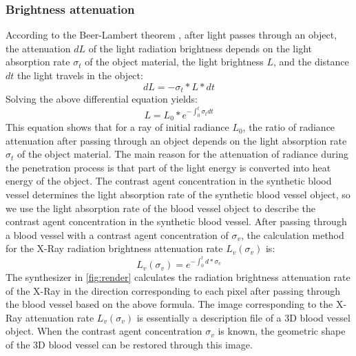 \subsubsection{Brightness attenuation}
According to the Beer-Lambert theorem \cite{Beer-Lambert}, after light passes through an object, the attenuation $dL$ of the light radiation brightness depends on the light absorption rate $\sigma_t$ of the object material, the light brightness $L$, and the distance $dt$ the light travels in the object:
\begin{equation}
dL = -\sigma_t * L * dt
\end{equation}
Solving the above differential equation yields:
\begin{equation}
L = L_0 * e^{-\int_0^t \sigma_t dt}
\end{equation}
This equation shows that for a ray of initial radiance $L_0$, the ratio of radiance attenuation after passing through an object depends on the light absorption rate $\sigma_t$ of the object material. The main reason for the attenuation of radiance during the penetration process is that part of the light energy is converted into heat energy of the object. The contrast agent concentration in the synthetic blood vessel determines the light absorption rate of the synthetic blood vessel object, so we use the light absorption rate of the blood vessel object to describe the contrast agent concentration in the synthetic blood vessel. After passing through a blood vessel with a contrast agent concentration of $\sigma_v$, the calculation method for the X-Ray radiation brightness attenuation rate $L_v(\sigma_v)$ is:
\begin{equation}
L_v(\sigma_v) = e^{-\int_0^t d*\sigma_v}
\end{equation}
The synthesizer in \cref{fig:render} calculates the radiation brightness attenuation rate of the X-Ray in the direction corresponding to each pixel after passing through the blood vessel based on the above formula. The image corresponding to the X-Ray attenuation rate $L_v(\sigma_v)$ is essentially a description file of a 3D blood vessel object. When the contrast agent concentration $\sigma_v$ is known, the geometric shape of the 3D blood vessel can be restored through this image.



